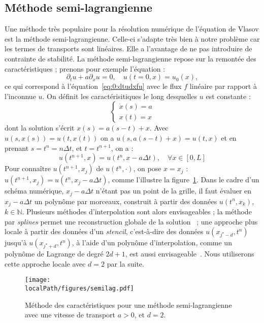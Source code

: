 \subsection{Méthode semi-lagrangienne}

Une méthode très populaire pour la résolution numérique de l'équation de Vlasov est la méthode semi-lagrangienne. Celle-ci s'adapte très bien à notre problème car les termes de transports sont linéaires. Elle a l'avantage de ne pas introduire de contrainte de stabilité. La méthode semi-lagrangienne repose sur la remontée des caractéristiques ; prenons pour exemple l'équation :
$$
  \partial_t u + a\partial_xu = 0,\quad u(t=0,x)=u_0(x),
$$
ce qui correspond à l'équation~\ref{eq:0:dtudxfu} avec le flux $f$ linéaire par rapport à l'inconnue $u$. On définit les caractérisitiques le long desquelles $u$ est constante :
$$
  \begin{cases}
    \dot{x}(s) = a \\
    x(t) = x
  \end{cases}
$$
dont la solution s'écrit $x(s) = a(s-t)+x$. Avec $u(s,x(s))=u(t,x(t))$ on a $u(s,a(s-t)+x) = u(t,x)$ et en prenant $s=t^n=n\Delta t$, et $t=t^{n+1}$, on a :
$$
  u(t^{n+1},x) = u(t^n,x-a\Delta t),\quad \forall x\in[0,L]
$$
Pour connaître $u(t^{n+1},x_j)$ de $u(t^n,\cdot)$, on pose $x=x_j$ : $u(t^{n+1},x_j) = u(t^n,x_j-a\Delta t)$, comme l'illustre la figure~\ref{fig:intro:semilag}. Dans le cadre d'un schéma numérique, $x_j-a\Delta t$ n'étant pas un point de la grille, il faut évaluer en $x_j-a\Delta t$ un polynôme par morceaux, construit à partir des données $u(t^n,x_k)$, $k\in\mathbb{N}$. Plusieurs méthodes d'interpolation sont alors envisageables ; la méthode par \emph{splines} permet une reconstruction globale de la solution~\cite{Cheng:1976,Sonnendrucker:2015} ; une approche plus locale à partir des données d'un \emph{stencil}, c'est-à-dire des données $u(x_{j^\star-d},t^n)$ jusqu'à $u(x_{j^\star+d},t^n)$, à l'aide d'un polynôme d'interpolation, comme un polynôme de Lagrange de degré $2d+1$, est aussi envisageable~\cite{Charles:2013}. Nous utiliserons cette approche locale avec $d=2$ par la suite.

\begin{figure}[h]
  \centering
  \texttt{[image: \\localPath/figures/semilag.pdf]}
  \caption{Méthode des caractéristiques pour une méthode semi-lagrangienne avec une vitesse de transport $a>0$, et $d=2$.}
  \label{fig:intro:semilag}
\end{figure}


